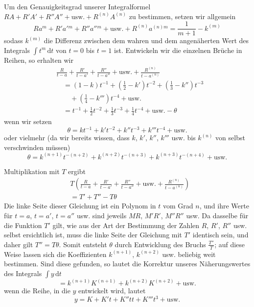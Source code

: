 Um den Genauigkeitsgrad unserer Integralformel $RA+R'A'+R''A''+\text{usw.}+R^{(n)}A^{(n)}$ zu bestimmen, setzen wir allgemein
\[
Ra^m+R'a'{}^m+R''a''{}^m+\text{usw.}+R^{(n)}a^{(n)m}=\frac{1}{m+1}-k^{(m)}
\]
sodass $k^{(m)}$ die Differenz zwischen dem wahren und dem angenäherten Wert des Integrals $\int t^m\,\mathrm{d}t$ von $t=0$ bis $t=1$ ist. Entwickeln wir die einzelnen Brüche in Reihen, so erhalten wir
\[
\begin{aligned}
&\frac{R}{t-a}+\frac{R'}{t-a'}+\frac{R''}{t-a''}+\text{usw.}+\frac{R^{(n)}}{t-a^{(n)}}\\
&\quad=(1-k)t^{-1}+(\tfrac12-k')t^{-2}+(\tfrac13-k'')t^{-3}\\ &\qquad+(\tfrac14-k''')t^{-4}+\text{usw.}\\
&\quad=t^{-1}+\tfrac12t^{-2}+\tfrac13t^{-3}+\tfrac14t^{-4}+\text{usw.}-\theta
\end{aligned}
\]
wenn wir setzen
\[
\theta=kt^{-1}+k't^{-2}+k''t^{-3}+k'''t^{-4}+\text{usw.}
\]
oder vielmehr (da wir bereits wissen, dass $k$, $k'$, $k''$, $k'''$ usw. bis $k^{(n)}$ von selbst verschwinden müssen)
\[
\theta=k^{(n+1)}t^{-(n+2)}+k^{(n+2)}t^{-(n+3)}+k^{(n+3)}t^{-(n+4)}+\text{usw.}
\]

Multiplikation mit $T$ ergibt
\[
\begin{aligned}&T\left(\frac{R}{t-a}+\frac{R'}{t-a'}+\frac{R''}{t-a''}+\text{usw.}+\frac{R^{(n)}}{t-a^{(n)}}\right)\\ &=T'+T''-T\theta\end{aligned}
\]
Die linke Seite dieser Gleichung ist ein Polynom in $t$ vom Grad $n$, und ihre Werte für $t=a$, $t=a'$, $t=a''$ usw. sind jeweils $MR$, $M'R'$, $M''R''$ usw. Da dasselbe für die Funktion $T'$ gilt, wie aus der Art der Bestimmung der Zahlen $R$, $R'$, $R''$ usw. selbst ersichtlich ist, muss die linke Seite der Gleichung mit $T'$ identisch sein, und daher gilt $T''=T\theta$. Somit entsteht $\theta$ durch Entwicklung des Bruchs $\frac{T''}{T}$; auf diese Weise lassen sich die Koeffizienten $k^{(n+1)}$, $k^{(n+2)}$ usw. beliebig weit bestimmen. Sind diese gefunden, so lautet die Korrektur unseres Näherungswertes des Integrals $\int y\,\mathrm{d}t$
\[
=k^{(n+1)}K^{(n+1)}+k^{(n+2)}K^{(n+2)}+\text{usw.}
\]
wenn die Reihe, in die $y$ entwickelt wird, lautet
\[
y=K+K't+K''tt+K'''t^3+\text{usw.}
\]

